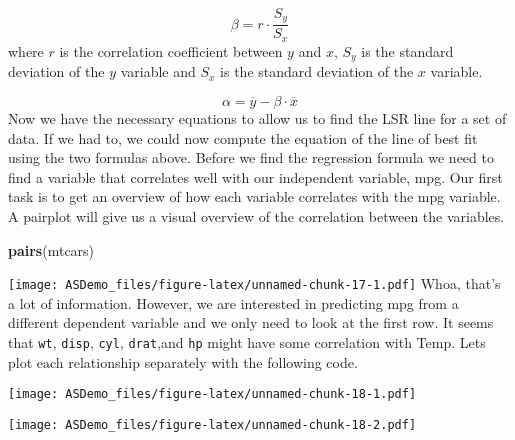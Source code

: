 \documentclass[]{book}
\newenvironment{Shaded}{\begin{snugshade}}{\end{snugshade}}
\newcommand{\KeywordTok}[1]{\textcolor[rgb]{0.13,0.29,0.53}{\textbf{#1}}}
\newcommand{\OperatorTok}[1]{\textcolor[rgb]{0.81,0.36,0.00}{\textbf{#1}}}
\newcommand{\NormalTok}[1]{#1}
\begin{document}
\[\beta = r \cdot \frac{S_y}{S_x}\] where \(r\) is the correlation
coefficient between \(y\) and \(x\), \(S_y\) is the standard deviation
of the \(y\) variable and \(S_x\) is the standard deviation of the \(x\)
variable.

\[\alpha = \overline y - \beta \cdot \overline x\] Now we have the
necessary equations to allow us to find the LSR line for a set of data.
If we had to, we could now compute the equation of the line of best fit
using the two formulas above. Before we find the regression formula we
need to find a variable that correlates well with our independent
variable, mpg. Our first task is to get an overview of how each variable
correlates with the mpg variable. A pairplot will give us a visual
overview of the correlation between the variables.

\begin{Shaded}
\begin{Highlighting}[]
\KeywordTok{pairs}\NormalTok{(mtcars)}
\end{Highlighting}
\end{Shaded}

\texttt{[image: ASDemo\_files/figure-latex/unnamed-chunk-17-1.pdf]} Whoa,
that's a lot of information. However, we are interested in predicting
mpg from a different dependent variable and we only need to look at the
first row. It seems that \texttt{wt}, \texttt{disp}, \texttt{cyl},
\texttt{drat},and \texttt{hp} might have some correlation with Temp.
Lets plot each relationship separately with the following code.

\begin{Shaded}
\end{Shaded}

\texttt{[image: ASDemo\_files/figure-latex/unnamed-chunk-18-1.pdf]}

\begin{Shaded}
\end{Shaded}

\texttt{[image: ASDemo\_files/figure-latex/unnamed-chunk-18-2.pdf]}

\begin{Shaded}
\end{Shaded}
\end{document}
